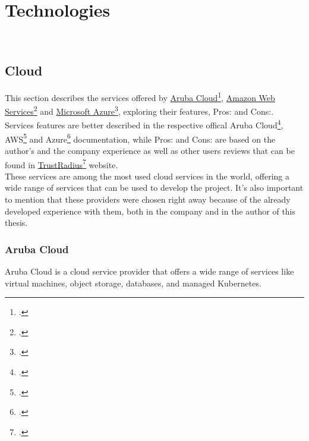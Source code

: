 \chapter{Technologies}
\label{cap:technologies}

\\

\section{Cloud}
\label{cloud}
This section describes the services offered by \href{https://www.arubacloud.com/}{Aruba Cloud}\footcite{site:aruba-cloud}, \href{https://aws.amazon.com/it/}{Amazon Web Services}\footcite{site:aws} and \href{https://azure.microsoft.com/it-it/}{Microsoft Azure}\footcite{site:azure}, exploring their features, Pros: and Cons:. 
Services features are better described in the respective offical Aruba Cloud\footcite{site:aruba-docs}, AWS\footcite{site:aws-docs} and Azure\footcite{site:azure-docs} documentation, 
while Pros: and Cons: are based on the author's and the company experience as well as other users reviews that can be found in 
\href{https://www.trustradius.com/}{TrustRadius}\footcite{site:trust-radius} website.\\
These services are among the most used cloud services in the world, offering a wide range of services that can be used to develop the project.
It's also important to mention that these providers were chosen right away because of the already developed experience with them, both in the company and in the author of this thesis.

    \subsection{Aruba Cloud}
    \label{aruba-cloud}
    Aruba Cloud is a cloud service provider that offers a wide range of services like virtual machines, object storage, databases, and managed Kubernetes.\\

